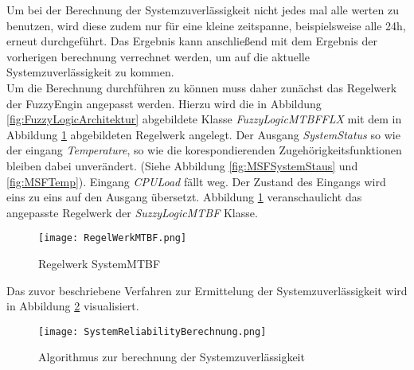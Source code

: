 Um bei der Berechnung der Systemzuverlässigkeit nicht jedes mal alle werten zu benutzen, wird diese zudem nur für eine kleine zeitspanne, beispielsweise alle 24h, erneut durchgeführt. Das Ergebnis kann anschließend mit dem Ergebnis der vorherigen berechnung verrechnet werden, um auf die aktuelle Systemzuverlässigkeit zu kommen.\\
Um die Berechnung durchführen zu können muss daher zunächst das Regelwerk der FuzzyEngin angepasst werden. Hierzu wird die in Abbildung \ref{fig:FuzzyLogicArchitektur} abgebildete Klasse \textit{FuzzyLogicMTBFFLX} mit dem in Abbildung \ref{fig:SystemMTBF} abgebildeten Regelwerk angelegt. Der Ausgang \textit{SystemStatus} so wie der eingang \textit{Temperature}, so wie die korespondierenden Zugehörigkeitsfunktionen bleiben dabei unverändert. (Siehe Abbildung \ref{fig:MSFSystemStaus} und \ref{fig:MSFTemp}). Eingang \textit{CPULoad} fällt weg. Der Zustand des Eingangs wird eins zu eins auf den Ausgang übersetzt. Abbildung \ref{fig:SystemMTBF} veranschaulicht das angepasste Regelwerk der \textit{SuzzyLogicMTBF} Klasse.
\begin{center}
    \begin{figure}[h!]
        \centering
        \texttt{[image: RegelWerkMTBF.png]}
        \caption{Regelwerk SystemMTBF}
        \label{fig:SystemMTBF}
    \end{figure}
\end{center}
\vspace{-0.5cm}
Das zuvor beschriebene Verfahren zur Ermittelung der Systemzuverlässigkeit wird in Abbildung \ref{fig:AblaufdiagramSystemReliability} visualisiert.
\begin{center}
    \begin{figure}[h!]
        \centering
        \texttt{[image: SystemReliabilityBerechnung.png]}
        \caption{Algorithmus zur berechnung der Systemzuverlässigkeit}
        \label{fig:AblaufdiagramSystemReliability}
    \end{figure}
\end{center}
\vspace{-0.5cm}

